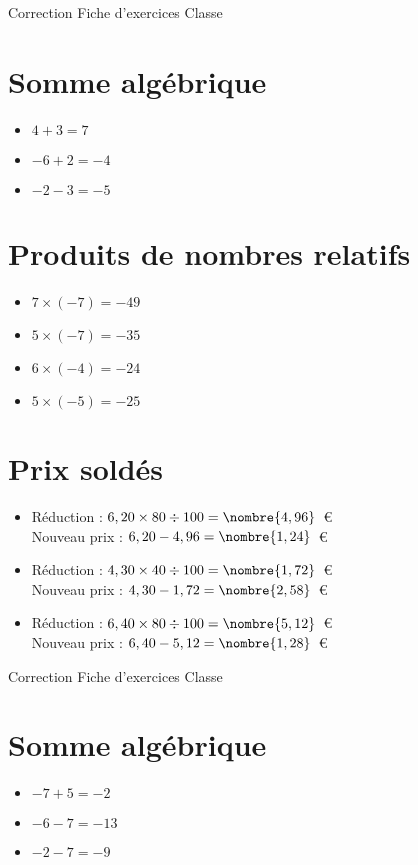 \documentclass[a4paper,11pt,fleqn]{article}
\begin{document}
\pagestyle{empty}


{Correction} \hfill {\huge Fiche d'exercices } \hfill {Classe}

\section{Somme algébrique}
\begin{itemize}

  \item $4 +3=7$
  \item $-6 +2=-4$
  \item $-2 -3=-5$
\end{itemize}

\section{Produits de nombres relatifs}
\begin{itemize}

  \item $7\times(-7)=-49$
  \item $5\times(-7)=-35$
  \item $6\times(-4)=-24$
  \item $5\times(-5)=-25$
\end{itemize}

\section{Prix soldés}
\begin{itemize}

  \item Réduction : $6,20\times80\div100=\nombre{4,96}$~€\\
  Nouveau prix : $6,20-4,96=\nombre{1,24}$~€
  \item Réduction : $4,30\times40\div100=\nombre{1,72}$~€\\
  Nouveau prix : $4,30-1,72=\nombre{2,58}$~€
  \item Réduction : $6,40\times80\div100=\nombre{5,12}$~€\\
  Nouveau prix : $6,40-5,12=\nombre{1,28}$~€
\end{itemize}
\newpage
\setcounter{exo}{0}
\setcounter{section}{0}
{Correction} \hfill {\huge Fiche d'exercices } \hfill {Classe}

\section{Somme algébrique}
\begin{itemize}

  \item $-7 +5=-2$
  \item $-6 -7=-13$
  \item $-2 -7=-9$
\end{itemize}
\end{document}
